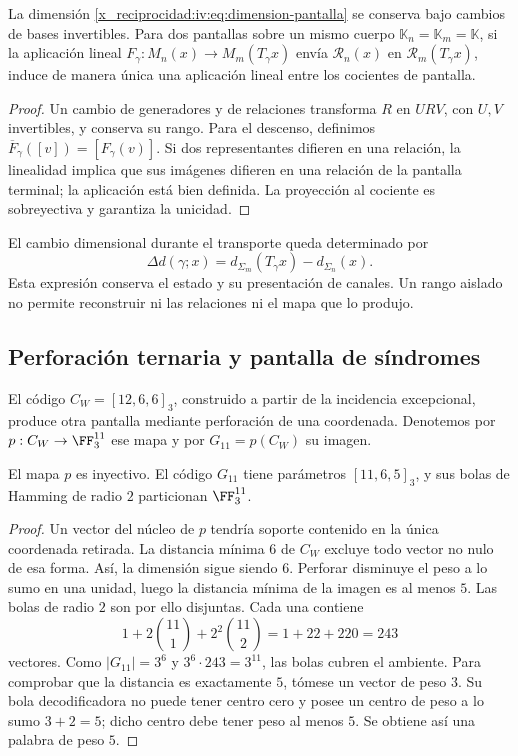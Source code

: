 \begin{proposition}
\label{x_reciprocidad:iv:prop:pantalla-transporte}
La dimensión \eqref{x_reciprocidad:iv:eq:dimension-pantalla} se conserva
bajo cambios de bases invertibles. Para dos pantallas sobre un mismo cuerpo
\(\mathbb K_n=\mathbb K_m=\mathbb K\), si la aplicación lineal
\(F_\gamma:M_n(x)\to M_m(T_\gamma x)\) envía
\(\mathcal R_n(x)\) en \(\mathcal R_m(T_\gamma x)\), induce
de manera única una aplicación lineal entre los cocientes de pantalla.
\end{proposition}
\begin{proof}
Un cambio de generadores y de relaciones transforma \(R\) en
\(URV\), con \(U,V\) invertibles, y conserva su rango. Para
el descenso, definimos
\(\overline F_\gamma([v])=[F_\gamma(v)]\). Si dos
representantes difieren en una relación, la linealidad implica que sus imágenes difieren
en una relación de la pantalla terminal; la aplicación está
bien definida. La proyección al cociente es sobreyectiva y
garantiza la unicidad.
\end{proof}

El cambio dimensional durante el transporte queda determinado
por
\[
 \Delta d(\gamma;x)=d_{\Sigma_m}(T_\gamma x)
                         -d_{\Sigma_n}(x).
\]
Esta expresión conserva el estado y su presentación de canales.
Un rango aislado no permite reconstruir ni las relaciones ni
el mapa que lo produjo.

\subsection{Perforación ternaria y pantalla de síndromes}

El código \(C_W=[12,6,6]_3\), construido a partir de la
incidencia excepcional, produce otra pantalla mediante
perforación de una coordenada. Denotemos por
\(p:C_W\to\FF_3^{11}\) ese mapa y por
\(G_{11}=p(C_W)\) su imagen.

\begin{proposition}
\label{x_reciprocidad:iv:prop:codigo-once}
El mapa \(p\) es inyectivo. El código \(G_{11}\) tiene
parámetros \([11,6,5]_3\), y sus bolas de Hamming de radio
\(2\) particionan \(\FF_3^{11}\).
\end{proposition}
\begin{proof}
Un vector del núcleo de \(p\) tendría soporte contenido en
la única coordenada retirada. La distancia mínima \(6\)
de \(C_W\) excluye todo vector no nulo de esa forma.
Así, la dimensión sigue siendo \(6\). Perforar disminuye
el peso a lo sumo en una unidad, luego la distancia mínima
de la imagen es al menos \(5\). Las bolas de radio \(2\)
son por ello disjuntas. Cada una contiene
\[
 1+2\binom{11}{1}+2^2\binom{11}{2}
 =1+22+220=243
\]
vectores. Como \(|G_{11}|=3^6\) y
\(3^6\cdot243=3^{11}\), las bolas cubren el ambiente.
Para comprobar que la distancia es exactamente \(5\),
tómese un vector de peso \(3\). Su bola decodificadora
no puede tener centro cero y posee un centro de peso a lo
sumo \(3+2=5\); dicho centro debe tener peso al menos
\(5\). Se obtiene así una palabra de peso \(5\).
\end{proof}

